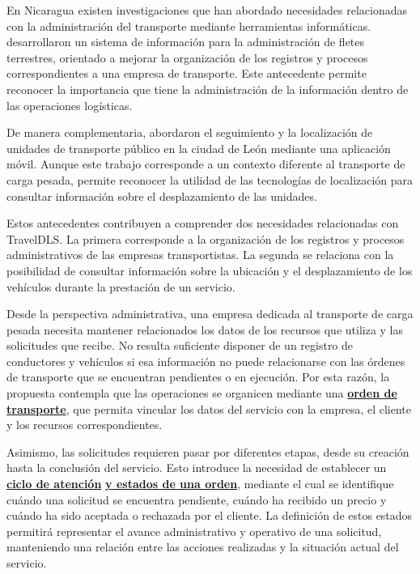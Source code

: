 En Nicaragua existen investigaciones que han abordado necesidades relacionadas con la administración del transporte mediante herramientas informáticas. \textcite{aragon2018implementacion} desarrollaron un sistema de información para la administración de fletes terrestres, orientado a mejorar la organización de los registros y procesos correspondientes a una empresa de transporte. Este antecedente permite reconocer la importancia que tiene la administración de la información dentro de las operaciones logísticas.

De manera complementaria, \textcite{garcia2022desarrollo} abordaron el seguimiento y la localización de unidades de transporte público en la ciudad de León mediante una aplicación móvil. Aunque este trabajo corresponde a un contexto diferente al transporte de carga pesada, permite reconocer la utilidad de las tecnologías de localización para consultar información sobre el desplazamiento de las unidades.

Estos antecedentes contribuyen a comprender dos necesidades relacionadas con TravelDLS. La primera corresponde a la organización de los registros y procesos administrativos de las empresas transportistas. La segunda se relaciona con la posibilidad de consultar información sobre la ubicación y el desplazamiento de los vehículos durante la prestación de un servicio.

Desde la perspectiva administrativa, una empresa dedicada al transporte de carga pesada necesita mantener relacionados los datos de los recursos que utiliza y las solicitudes que recibe. No resulta suficiente disponer de un registro de conductores y vehículos si esa información no puede relacionarse con las órdenes de transporte que se encuentran pendientes o en ejecución. Por esta razón, la propuesta contempla que las operaciones se organicen mediante una \textbf{\hyperlink{concepto-orden}{orden de transporte}}, que permita vincular los datos del servicio con la empresa, el cliente y los recursos correspondientes.

Asimismo, las solicitudes requieren pasar por diferentes etapas, desde su creación hasta la conclusión del servicio. Esto introduce la necesidad de establecer un \textbf{\hyperlink{concepto-estados}{ciclo de atención}} \textbf{\hyperlink{concepto-estados}{y estados de una orden}}, mediante el cual se identifique cuándo una solicitud se encuentra pendiente, cuándo ha recibido un precio y cuándo ha sido aceptada o rechazada por el cliente. La definición de estos estados permitirá representar el avance administrativo y operativo de una solicitud, manteniendo una relación entre las acciones realizadas y la situación actual del servicio.

